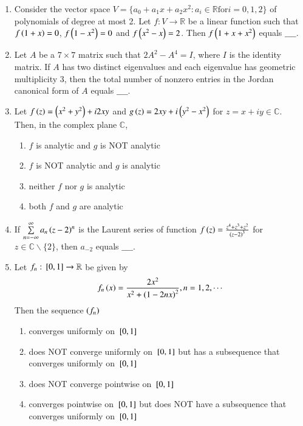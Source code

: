 \documentclass[journal]{IEEEtran}
\begin{document}
\begin{enumerate}
\item Consider the vector space $V = \{a_0 + a_1x + a_2x^2 : a_i \in \mathbb{R} \text{for} i = 0, 1 ,2\}$ of polynomials of degree at most 2. Let $f: V \rightarrow \mathbb{R}$ be a linear function such that $f\left(1+x\right) = 0$, $f\left(1-x^2\right) = 0$ and $f\left(x^2-x\right) = 2$. Then $f\left(1+x+x^2\right)$ equals $\_\_\_\_$. \\
\item Let $A$ be a $7 \times 7$ matrix such that $2A^2 - A^4 = I$, where $I$ is the identity matrix. If $A$ has two distinct eigenvalues and each eigenvalue has geometric multiplicity 3, then the total number of nonzero entries in the Jordan canonical form of $A$ equals $\_\_\_\_$. \\
\item Let $f\left(z\right) = \left(x^2 + y^2\right) + i2xy$ and $g\left(z\right) = 2xy + i\left(y^2 - x^2\right)$ for $z = x + iy \in \mathbb{C}$. Then, in the complex plane $\mathbb{C}$,
\begin{enumerate}
    \item $f$ is analytic and $g$ is NOT analytic
    \item $f$ is NOT analytic and $g$ is analytic
    \item neither $f$ nor $g$ is analytic
    \item both $f$ and $g$ are analytic \\
\end{enumerate}
\item If $\sum\limits_{n=-\infty}^{\infty}a_n\left(z-2\right)^n$ is the Laurent series of function $f\left(z\right) = \frac{z^4 + z^3 + z^2}{\left(z - 2\right)^3}$ for $z \in \mathbb{C}\backslash\{2\}$, then $a_{-2}$ equals $\_\_\_\_$. \\
\item Let $f_n : {}\left[0,1\right]\rightarrow\mathbb{R}$ be given by 
\begin{align*}
    f_n\left(x\right) = \frac{2x^2}{x^2 + \left(1-2nx\right)^2}, n = 1, 2, \cdots
\end{align*}
Then the sequence $\left(f_n\right)$
\begin{enumerate}
    \item converges uniformly on ${}\left[0,1\right]$
    \item does NOT converge uniformly on ${}\left[0,1\right]$ but has a subsequence that converges uniformly on ${}\left[0,1\right]$
    \item does NOT converge pointwise on ${}\left[0,1\right]$
    \item converges pointwise on ${}\left[0,1\right]$ but does NOT have a subsequence that converges uniformly on ${}\left[0,1\right]$ \\

\end{enumerate}
\end{enumerate}
\end{document}
